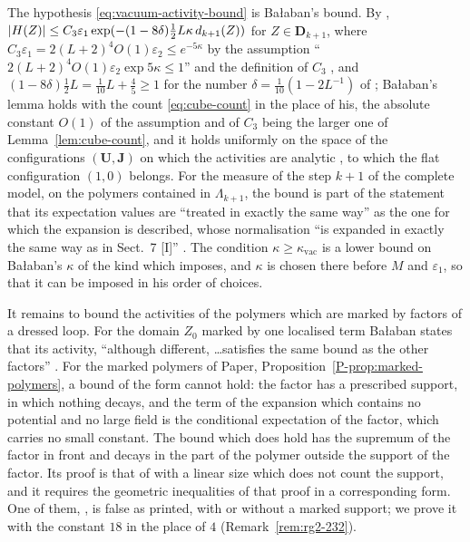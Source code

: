 \documentclass[11pt]{preprint}
\DeclarePairedDelimiter{\abs}{\lvert}{\rvert}
\numberwithin{equation}{section}
\theoremstyle{definition}
\theoremstyle{remark}
\theoremstyle{plain}
\begin{document}
The hypothesis \eqref{eq:vacuum-activity-bound} is Ba{\l}aban's bound. By \cite[Lemma~3, (2.38)]{BalabanRG2}, $\abs{H(Z)} \leq C_3\varepsilon_1\exp(-(1 - 8\delta)\frac12L\kappa\,d_{k+1}(Z))$ for $Z \in \mathbf D_{k+1}$, where $C_3\varepsilon_1 = 2(L + 2)^4O(1)\varepsilon_2 \leq e^{-5\kappa}$ by the assumption ``$2(L + 2)^4O(1)\varepsilon_2\exp5\kappa \leq 1$'' and the definition of $C_3$ \cite[p.~20]{BalabanRG2}, and $(1 - 8\delta)\frac12L = \frac{1}{10}L + \frac45 \geq 1$ for the number $\delta = \frac{1}{10}(1 - 2L^{-1})$ of \cite[p.~21]{BalabanRG2}; Ba{\l}aban's lemma holds with the count \eqref{eq:cube-count} in the place of his, the absolute constant $O(1)$ of the assumption and of $C_3$ being the larger one of Lemma~\ref{lem:cube-count}, and it holds uniformly on the space of the configurations $(\mathbf U, \mathbf J)$ on which the activities are analytic \cite[p.~15]{BalabanRG2}, to which the flat configuration $(1, 0)$ belongs. For the measure \cite[(3.27)]{BalabanCRE} of the step $k + 1$ of the complete model, on the polymers contained in $\Lambda_{k+1}$, the bound is part of the statement that its expectation values are ``treated in exactly the same way'' \cite[p.~279]{BalabanCRE} as the one for which the expansion is described, whose normalisation ``is expanded in exactly the same way as in Sect.~7 [I]'' \cite[p.~277]{BalabanCRE}. The condition $\kappa \geq \kappa_{\mathrm{vac}}$ is a lower bound on Ba{\l}aban's $\kappa$ of the kind which \cite[p.~21]{BalabanRG2} imposes, and $\kappa$ is chosen there before $M$ and $\varepsilon_1$, so that it can be imposed in his order of choices.

It remains to bound the activities of the polymers which are marked by factors of a dressed loop. For the domain $Z_0$ marked by one localised term Ba{\l}aban states that its activity, ``although different, \dots satisfies the same bound as the other factors'' \cite[p.~277]{BalabanCRE}. For the marked polymers of Paper, Proposition~\ref{P-prop:marked-polymers}, a bound of the form \cite[(2.38)]{BalabanRG2} cannot hold: the factor has a prescribed support, in which nothing decays, and the term of the expansion which contains no potential and no large field is the conditional expectation of the factor, which carries no small constant. The bound which does hold has the supremum of the factor in front and decays in the part of the polymer outside the support of the factor. Its proof is that of \cite[Lemma~3]{BalabanRG2} with a linear size which does not count the support, and it requires the geometric inequalities of that proof in a corresponding form. One of them, \cite[(2.32), p.~18]{BalabanRG2}, is false as printed, with or without a marked support; we prove it with the constant $18$ in the place of $4$ (Remark~\ref{rem:rg2-232}).
\end{document}
